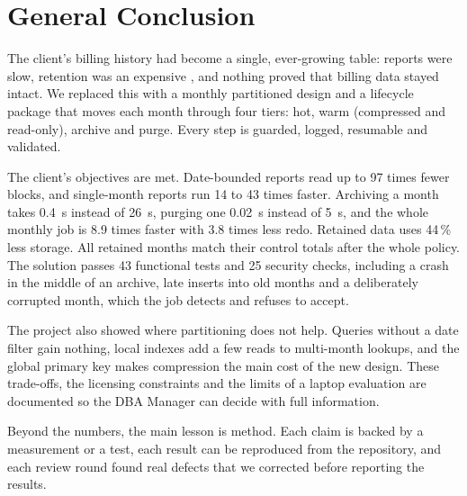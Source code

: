 \chapter{General Conclusion}\label{ch:conclusion}

The client's billing history had become a single, ever-growing table: reports were slow,
retention was an expensive , and nothing proved that billing data stayed intact.
We replaced this with a monthly partitioned design and a lifecycle package that moves each
month through four tiers: hot, warm (compressed and read-only), archive and purge. Every step
is guarded, logged, resumable and validated.

The client's objectives are met. Date-bounded reports read up to 97 times fewer blocks, and
single-month reports run 14 to 43 times faster. Archiving a month takes 0.4~s instead of 26~s,
purging one 0.02~s instead of 5~s, and the whole monthly job is 8.9 times faster with 3.8 times less redo.
Retained data uses 44\,\% less storage. All retained months match their control totals after
the whole policy. The solution passes 43 functional tests and 25 security checks, including a
crash in the middle of an archive, late inserts into old months and a deliberately corrupted
month, which the job detects and refuses to accept.

The project also showed where partitioning does not help. Queries without a date filter gain
nothing, local indexes add a few reads to multi-month lookups, and the global primary key makes
compression the main cost of the new design. These trade-offs, the licensing constraints and
the limits of a laptop evaluation are documented so the DBA Manager can decide with full
information.

Beyond the numbers, the main lesson is method. Each claim is backed by a measurement or a
test, each result can be reproduced from the repository, and each review round found real
defects that we corrected before reporting the results.
